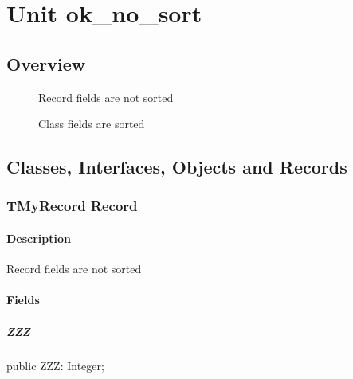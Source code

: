 \documentclass{report}
\begin{document}
\newlength{\tmplength}
\chapter{Unit ok{\_}no{\_}sort}
\section{Overview}
\begin{description}
\item[\texttt{\begin{ttfamily}TMyRecord\end{ttfamily} Record}]Record fields are not sorted
\item[\texttt{\begin{ttfamily}TMyClass\end{ttfamily} Class}]Class fields are sorted
\end{description}
\section{Classes, Interfaces, Objects and Records}
\subsection*{TMyRecord Record}
\subsubsection*{\large{\textbf{Description}}\normalsize\hspace{1ex}\hfill}
Record fields are not sorted\subsubsection*{\large{\textbf{Fields}}\normalsize\hspace{1ex}\hfill}
\paragraph*{ZZZ}\hspace*{\fill}

\begin{list}{}{
\setlength{\itemindent}{0cm}
\setlength{\listparindent}{0cm}
\setlength{\leftmargin}{\evensidemargin}
\addtolength{\leftmargin}{\tmplength}
\settowidth{\labelsep}{X}
\addtolength{\leftmargin}{\labelsep}
\setlength{\labelwidth}{\tmplength}
}
\begin{flushleft}
\item[\textbf{Declaration}\hfill]
\begin{ttfamily}
public ZZZ: Integer;\end{ttfamily}


\end{flushleft}
\end{list}
\end{document}
